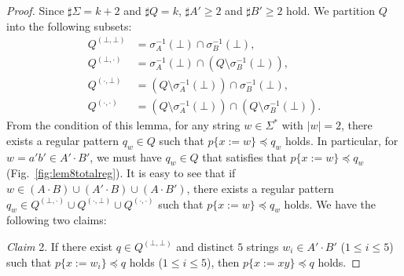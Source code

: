 \begin{proof}
Since $\sharp \Sigma = k + 2$ and $\sharp Q = k$, $\sharp A' \geq 2$ and $\sharp B' \geq 2$ hold.
We partition $Q$ into the following subsets:
\begin{align*}
  Q^{(\bot,\bot)} & = \sigma_{A}^{-1}(\bot) \cap \sigma_{B}^{-1}(\bot),\\
  Q^{(\bot,\cdot)} & = \sigma_{A}^{-1}(\bot) \cap (Q\setminus \sigma_{B}^{-1}(\bot)),\\
  Q^{(\cdot,\bot)} & = (Q\setminus \sigma_{A}^{-1}(\bot)) \cap \sigma_{B}^{-1}(\bot),\\
  Q^{(\cdot,\cdot)} & = (Q\setminus \sigma_{A}^{-1}(\bot)) \cap (Q\setminus \sigma_{B}^{-1}(\bot)).
\end{align*}
From the condition of this lemma, for any string $w \in \Sigma^{\ast}$ with $|w|=2$, there exists a regular pattern $q_{w} \in Q$ such that $p \{ x:=w \} \preceq q_{w}$ holds.
In particular, for $w=a'b'\in A'\cdot B'$, we must have $q_{w} \in Q$ that satisfies that $p \{ x:=w \} \preceq q_{w}$ (Fig.~\ref{fig:lem8totalreg}).
It is easy to see that if $w \in (A\cdot B) \cup (A'\cdot B) \cup (A\cdot B')$, there exists a regular pattern $q_{w} \in Q^{(\bot,\cdot)} \cup Q^{(\cdot,\bot)} \cup Q^{(\cdot,\cdot)}$ such that $p \{ x:=w \} \preceq q_{w}$ holds.
We have the following two claims:
\smallskip

\noindent
\textit{Claim} 2. If there exist $q \in Q^{(\bot,\bot)}$ and distinct $5$ strings $w_{i} \in A'\cdot B'$ ($1\leq i\leq 5$) such  that $p \{ x:=w_{i} \} \preceq q$ holds ($1\leq i\leq 5$),  then $p \{ x:=xy \} \preceq q$ holds.

\smallskip


\end{proof}
